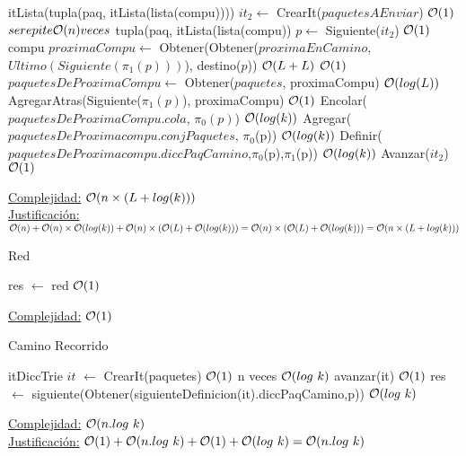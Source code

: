 \begin{Algoritmos}
\begin{algorithm}
\begin{algorithmic}[1]
  \State itLista(tupla(paq, itLista(lista(compu)))) $it_2 \gets$ CrearIt($paquetesAEnviar$) \Comment  $\mathcal{O}(1)$
   \Comment  $se repite \mathcal{O}(n) veces$
      \State tupla(paq, itLista(lista(compu)) $p \gets$ Siguiente($it_2$) \Comment  $\mathcal{O}(1)$
      \State compu $proximaCompu \gets$ Obtener(Obtener($proximaEnCamino$, $Ultimo(Siguiente(\pi_1(p)))$), destino($p$)) 
      \State \Comment  $\mathcal{O}(L + L)$
       \Comment  $\mathcal{O}(1)$
	\State $paquetesDeProximaCompu \gets$ Obtener($paquetes$, proximaCompu) \Comment  $\mathcal{O}(log(L))$
      	\State AgregarAtras(Siguiente($\pi_1(p)$), proximaCompu) \Comment  $\mathcal{O}(1)$
      	\State Encolar($paquetesDeProximaCompu$.$cola$, $\pi_0(p)$) \Comment  $\mathcal{O}(log(k))$
      	\State Agregar($paquetesDeProximacompu$.$conjPaquetes$, $\pi_0$(p)) \Comment  $\mathcal{O}(log(k))$
	\State Definir($paquetesDeProximacompu.diccPaqCamino$,$\pi_0$(p),$\pi_1$(p)) \Comment  $\mathcal{O}(log(k))$
      \EndIf
      \State Avanzar($it_2$) \Comment  $\mathcal{O}(1)$
  \EndWhile
 
 \EndProcedure
 \end{algorithmic}
 \underline{Complejidad:} $\mathcal{O}(n \times (L + log(k)))$\\
 \underline{Justificación:} $\mathcal{O}(n)+\mathcal{O}(n) \times \mathcal{O}(log(k))+\mathcal{O}(n)\times (\mathcal{O}(L) + \mathcal{O}(log(k))) = \mathcal{O}(n) \times (\mathcal{O}(L) + \mathcal{O}(log(k)))=
 \mathcal{O}(n \times (L + log(k)))$
\end{algorithm}



\begin{algorithm}
\caption{Red}
\begin{algorithmic}[1]
 \State res $\gets$ red \Comment $\mathcal{O}(1)$
 \EndProcedure
\end{algorithmic}
   \underline{Complejidad:} $\mathcal{O}(1)$
\end{algorithm}

\begin{algorithm}
\caption{Camino Recorrido}
\begin{algorithmic}[1]
   \State itDiccTrie $it$ $\gets$ CrearIt(paquetes) \Comment $\mathcal{O}(1)$
    \Comment n veces $\mathcal{O}(log \ k)$
   \State avanzar(it) \Comment $\mathcal{O}(1)$
   \EndWhile
   \State res $\gets$ siguiente(Obtener(siguienteDefinicion(it).diccPaqCamino,p)) \Comment $\mathcal{O}(log \ k)$
  \EndProcedure
\end{algorithmic}
 \underline{Complejidad:} $\Ogr(n.log \ k)$\\
 \underline{Justificación:} $\Ogr(1)+\Ogr(n.log \ k)+\Ogr(1)+\Ogr(log \ k) = \Ogr(n.log \ k)$
\end{algorithm}



\end{Algoritmos}
